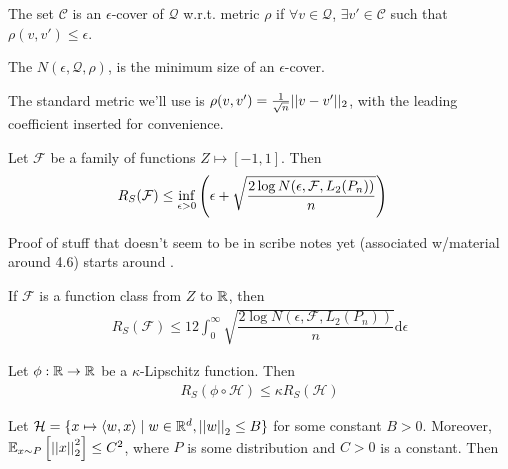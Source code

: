\documentclass[11pt]{article}
\begin{document}
\begin{definition}
	The set $\mathcal C$ is an $\epsilon$-cover of $\mathcal Q$ w.r.t. metric $\rho$ if $\forall v \in \mathcal Q$, $\exists v' \in \mathcal C$ such that $\rho(v, v') \leq \epsilon$. 
\end{definition}

\begin{definition}
	The  $N(\epsilon, \mathcal Q, \rho)$,  is the minimum size of an $\epsilon$-cover. 
	
	The standard metric we'll use is $\rho(v, v') = \inv{\sqrt{n} }|| v - v' ||_2$, with the leading coefficient inserted for convenience. 
\end{definition}

\begin{definition}[-1em][Theorem 4.24]
	Let $\mathcal F$ be a family of functions $Z \mapsto [-1, 1]$. Then
	\begin{align}
		R_S(\mathcal F)
			&\leq \inf_{\epsilon > 0} \lr{
				\epsilon + \sqrt{\dfrac{ 2 \log N(\epsilon, \mathcal F, L_2(P_n))  }{  n  }}
			}
	\end{align}
\end{definition}

Proof of stuff that doesn't seem to be in scribe notes yet (associated w/material around 4.6) starts around . 

\begin{definition}
	If $\mathcal F$ is a function class from $Z$ to $\R$, then 
	\begin{align}
		R_S(\mathcal F)
			\leq 12 \int_0^{\infty}  \sqrt{\dfrac{ 2 \log N(\epsilon, \mathcal F, L_2(P_n))  }{  n  }} \mathrm{d}\epsilon
	\end{align}
\end{definition}

\myspace
{}
\myspace

\begin{definition}
	Let $\phi :\R \to \R$ be a $\kappa$-Lipschitz function. Then
	\begin{align}
		R_S(\phi \circ \mathcal H) \leq \kappa R_S(\mathcal H)
	\end{align}
\end{definition}

\begin{definition}
	Let $\mathcal H = \{ x \mapsto \langle w, x \rangle \mid w \in \R^d, \norm{w}  \leq B  \}$ for some constant $B > 0$. Moreover,  $\E[x \sim P]{\norm{x}^2} \leq C^2$, where $P$ is some distribution and $C > 0$ is a constant. Then 
\end{definition}
\end{document}
